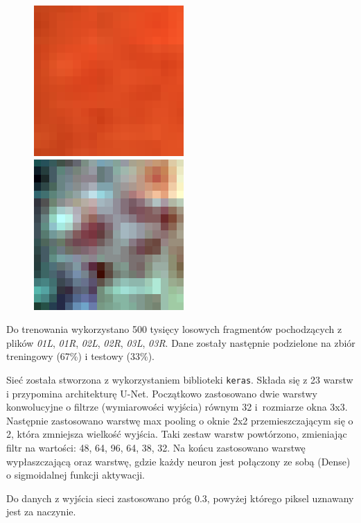 \documentclass[polish,polish,a4paper]{article}
\begin{document}
\begin{figure}[!h]
	\centering
	\begin{minipage}{0.3\linewidth}
		\includegraphics[scale=0.5]{./dane/preprocess.png}
	\end{minipage}
	\begin{minipage}{0.3\linewidth}
		\includegraphics[scale=0.5]{./dane/postprocess.png}
	\end{minipage}
\end{figure}

Do trenowania wykorzystano 500 tysięcy losowych fragmentów pochodzących z plików \textit{01L}, \textit{01R}, \textit{02L}, \textit{02R}, \textit{03L}, \textit{03R}. Dane zostały następnie podzielone na zbiór treningowy (67\%) i testowy (33\%).

Sieć została stworzona z wykorzystaniem biblioteki \texttt{keras}.
Składa się z 23 warstw i przypomina architekturę U-Net. 
Początkowo zastosowano dwie warstwy konwolucyjne o filtrze (wymiarowości wyjścia) równym 32 i~rozmiarze okna 3x3.
Następnie zastosowano warstwę max pooling o oknie 2x2 przemieszczającym się o 2, która zmniejsza wielkość wyjścia.
Taki zestaw warstw powtórzono, zmieniając filtr na wartości: 48, 64, 96, 64, 38, 32.
Na końcu zastosowano warstwę wypłaszczającą oraz warstwę, gdzie każdy neuron jest połączony ze sobą (Dense) o sigmoidalnej funkcji aktywacji.

Do danych z wyjścia sieci zastosowano próg 0.3, powyżej którego piksel uznawany jest za naczynie.
\end{document}
